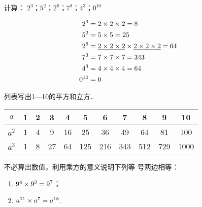 \begin{example}
    计算：
$2^3$；$5^2$；$2^6$；$7^8$；$4^3 $；$0^{10}$
\end{example}

\begin{solution}
    \[\begin{split}
        2^3&=2\times2\times2=8\\
        5^2&=5\times5=25\\
        2^6&=\underline{2\times2\times2}\times\underline{2\times2\times2}=64\\
        7^3&=7\times7\times7=343\\
        4^3&=4\times4\times4=64\\
        0^{10}&=0
    \end{split}\]
\end{solution}

\begin{example}
    列表写出1—10的平方和立方．
\end{example}

\begin{solution}
    \begin{center}
        \begin{tabular}{c|cccccccccc}
            \hline
$a$ & 1&2&3&4&5&6&7&8&9&10\\
            \hline
$a^2$&1&4&9&16&25&36&49&64&81&100\\
$a^3$&1&8&27&64&125&216&343&512&729&1000\\
            \hline
        \end{tabular}
    \end{center}
\end{solution}

\begin{example}
不必算出数值，利用乘方的意义说明下列等
号两边相等：
\begin{enumerate}
    \item $9^4\times9^3=9^7$；
    \item $a^{11}\times a^7=a^{18}$.
\end{enumerate}
\end{example}

